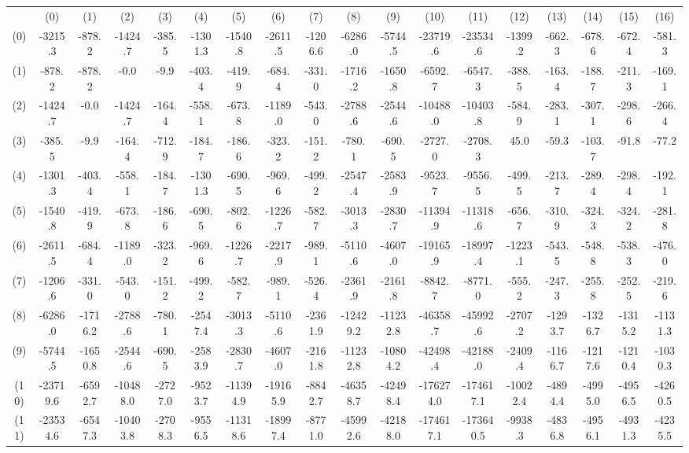 \begin{tabular}{cccccccccccccccccc}
 & (0) & (1) & (2) & (3) & (4) & (5) & (6) & (7) & (8) & (9) & (10) & (11) & (12) & (13) & (14) & (15) & (16) \\
(0) & -3215.3 & -878.2 & -1424.7 & -385.5 & -1301.3 & -1540.8 & -2611.5 & -1206.6 & -6286.0 & -5744.5 & -23719.6 & -23534.6 & -1399.2 & -662.3 & -678.6 & -672.4 & -581.3 \\
(1) & -878.2 & -878.2 & -0.0 & -9.9 & -403.4 & -419.9 & -684.4 & -331.0 & -1716.2 & -1650.8 & -6592.7 & -6547.3 & -388.5 & -163.4 & -188.7 & -211.3 & -169.1 \\
(2) & -1424.7 & -0.0 & -1424.7 & -164.4 & -558.1 & -673.8 & -1189.0 & -543.0 & -2788.6 & -2544.6 & -10488.0 & -10403.8 & -584.9 & -283.1 & -307.1 & -298.6 & -266.4 \\
(3) & -385.5 & -9.9 & -164.4 & -712.9 & -184.7 & -186.6 & -323.2 & -151.2 & -780.1 & -690.5 & -2727.0 & -2708.3 & 45.0 & -59.3 & -103.7 & -91.8 & -77.2 \\
(4) & -1301.3 & -403.4 & -558.1 & -184.7 & -1301.3 & -690.5 & -969.6 & -499.2 & -2547.4 & -2583.9 & -9523.7 & -9556.5 & -499.5 & -213.7 & -289.4 & -298.4 & -192.1 \\
(5) & -1540.8 & -419.9 & -673.8 & -186.6 & -690.5 & -802.6 & -1226.7 & -582.7 & -3013.3 & -2830.7 & -11394.9 & -11318.6 & -656.7 & -310.9 & -324.3 & -324.2 & -281.8 \\
(6) & -2611.5 & -684.4 & -1189.0 & -323.2 & -969.6 & -1226.7 & -2217.9 & -989.1 & -5110.6 & -4607.0 & -19165.9 & -18997.4 & -1223.1 & -543.5 & -548.8 & -538.3 & -476.0 \\
(7) & -1206.6 & -331.0 & -543.0 & -151.2 & -499.2 & -582.7 & -989.1 & -526.4 & -2361.9 & -2161.8 & -8842.7 & -8771.0 & -555.2 & -247.3 & -255.8 & -252.5 & -219.6 \\
(8) & -6286.0 & -1716.2 & -2788.6 & -780.1 & -2547.4 & -3013.3 & -5110.6 & -2361.9 & -12429.2 & -11232.8 & -46358.7 & -45992.6 & -2707.2 & -1293.7 & -1326.7 & -1315.2 & -1131.3 \\
(9) & -5744.5 & -1650.8 & -2544.6 & -690.5 & -2583.9 & -2830.7 & -4607.0 & -2161.8 & -11232.8 & -10804.2 & -42498.4 & -42188.0 & -2409.4 & -1166.7 & -1217.6 & -1210.4 & -1030.3 \\
(10) & -23719.6 & -6592.7 & -10488.0 & -2727.0 & -9523.7 & -11394.9 & -19165.9 & -8842.7 & -46358.7 & -42498.4 & -176274.0 & -174617.1 & -10022.4 & -4894.4 & -4995.0 & -4956.5 & -4260.5 \\
(11) & -23534.6 & -6547.3 & -10403.8 & -2708.3 & -9556.5 & -11318.6 & -18997.4 & -8771.0 & -45992.6 & -42188.0 & -174617.1 & -173640.5 & -9938.3 & -4836.8 & -4956.1 & -4931.3 & -4235.5 \\

\end{tabular}
